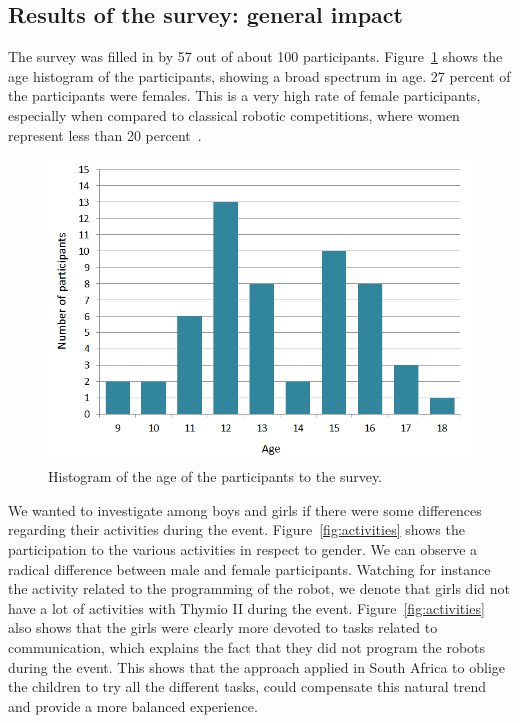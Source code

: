 \documentclass{intech-journal}
\begin{document}
\subsection{Results of the survey: general impact}

The survey was filled in by 57 out of about 100 participants. 
Figure~\ref{fig:age} shows the age histogram of the participants, showing a broad spectrum in age.
27 percent of the participants were females.
This is a very high rate of female participants, especially when compared to classical robotic competitions, where women represent less than 20 percent~\cite{riedo2013upgrade}.

\begin{figure}[ht]
 \centering
    \includegraphics[width=0.5\columnwidth]{figures/Age.png}
  \caption{Histogram of the age of the participants to the survey.}
  \label{fig:age} 
\end{figure}

We wanted to investigate among boys and girls if there were some differences regarding their activities during the event.
Figure~\ref{fig:activities} shows the participation to the various activities in respect to gender. 
We can observe a radical difference between male and female participants. 
Watching for instance the activity related to the programming of the robot, we denote that girls did not have a lot of activities with Thymio II during the event. 
Figure~\ref{fig:activities} also shows that the girls were clearly more devoted to tasks related to communication, which explains the fact that they did not program the robots during the event. 
This shows that the approach applied in South Africa to oblige the children to try all the different tasks, could compensate this natural trend and provide a more balanced experience.
\end{document}
